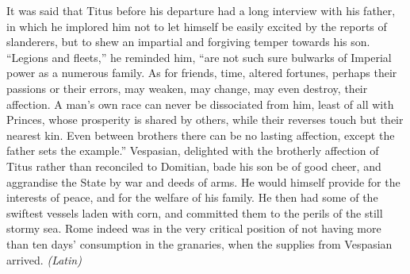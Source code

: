 
It was said that Titus before his departure had a long interview with his father, in which he implored him not to let himself be easily excited by the reports of slanderers, but to shew an impartial and forgiving temper towards his son. ``Legions and fleets,'' he reminded him, ``are not such sure bulwarks of Imperial power as a numerous family. As for friends, time, altered fortunes, perhaps their passions or their errors, may weaken, may change, may even destroy, their affection. A man's own race can never be dissociated from him, least of all with Princes, whose prosperity is shared by others, while their reverses touch but their nearest kin. Even between brothers there can be no lasting affection, except the father sets the example.'' Vespasian, delighted with the brotherly affection of Titus rather than reconciled to Domitian, bade his son be of good cheer, and aggrandise the State by war and deeds of arms. He would himself provide for the interests of peace, and for the welfare of his family. He then had some of the swiftest vessels laden with corn, and committed them to the perils of the still stormy sea. Rome indeed was in the very critical position of not having more than ten days' consumption in the granaries, when the supplies from Vespasian arrived. \emph{(Latin)}


